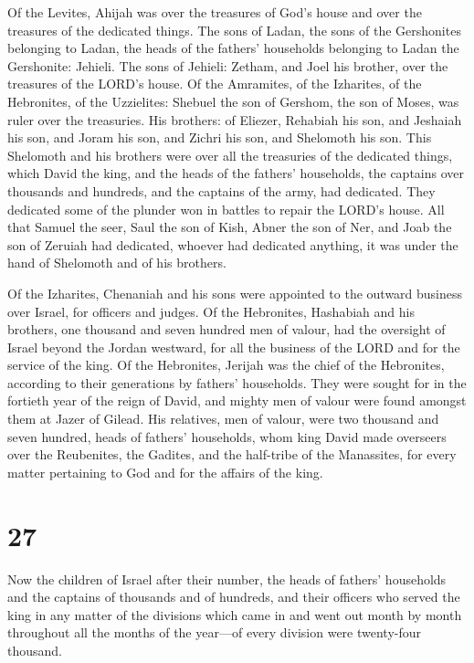  Of the Levites, Ahijah was over the treasures of God's
house and over the treasures of the dedicated things. 
The sons of Ladan, the sons of the Gershonites belonging to Ladan, the
heads of the fathers' households belonging to Ladan the Gershonite:
Jehieli.  The sons of Jehieli: Zetham, and Joel his
brother, over the treasures of the LORD's house.  Of the
Amramites, of the Izharites, of the Hebronites, of the Uzzielites:
 Shebuel the son of Gershom, the son of Moses, was ruler
over the treasuries.  His brothers: of Eliezer, Rehabiah
his son, and Jeshaiah his son, and Joram his son, and Zichri his son,
and Shelomoth his son.  This Shelomoth and his brothers
were over all the treasuries of the dedicated things, which David the
king, and the heads of the fathers' households, the captains over
thousands and hundreds, and the captains of the army, had dedicated.
 They dedicated some of the plunder won in battles to
repair the LORD's house.  All that Samuel the seer, Saul
the son of Kish, Abner the son of Ner, and Joab the son of Zeruiah had
dedicated, whoever had dedicated anything, it was under the hand of
Shelomoth and of his brothers.

 Of the Izharites, Chenaniah and his sons were appointed
to the outward business over Israel, for officers and judges.
 Of the Hebronites, Hashabiah and his brothers, one
thousand and seven hundred men of valour, had the oversight of Israel
beyond the Jordan westward, for all the business of the LORD and for the
service of the king.  Of the Hebronites, Jerijah was the
chief of the Hebronites, according to their generations by fathers'
households. They were sought for in the fortieth year of the reign of
David, and mighty men of valour were found amongst them at Jazer of
Gilead.  His relatives, men of valour, were two thousand
and seven hundred, heads of fathers' households, whom king David made
overseers over the Reubenites, the Gadites, and the half-tribe of the
Manassites, for every matter pertaining to God and for the affairs of
the king.

\hypertarget{section-26}{%
\section{27}\label{section-26}}

 Now the children of Israel after their number, the heads
of fathers' households and the captains of thousands and of hundreds,
and their officers who served the king in any matter of the divisions
which came in and went out month by month throughout all the months of
the year---of every division were twenty-four thousand.

